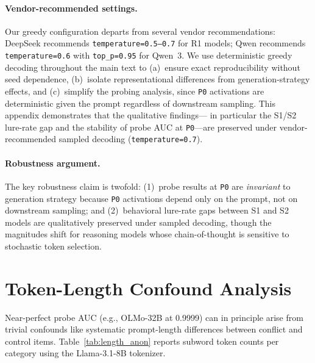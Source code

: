 \documentclass{article}
\newcommand{\pzero}{\texttt{P0}}
\begin{document}
\paragraph{Vendor-recommended settings.}
Our greedy configuration departs from several vendor recommendations:
DeepSeek recommends \texttt{temperature=0.5--0.7} for R1 models;
Qwen recommends \texttt{temperature=0.6} with \texttt{top\_p=0.95}
for Qwen~3.  We use deterministic greedy decoding throughout the main
text to (a)~ensure exact reproducibility without seed dependence,
(b)~isolate representational differences from generation-strategy
effects, and (c)~simplify the probing analysis, since \pzero{}
activations are deterministic given the prompt regardless of downstream
sampling.  This appendix demonstrates that the qualitative findings---
in particular the S1/S2 lure-rate gap and the stability of probe AUC
at \pzero{}---are preserved under vendor-recommended sampled decoding
(\texttt{temperature=0.7}).

\paragraph{Robustness argument.}
The key robustness claim is twofold: (1)~probe results at \pzero{}
are \emph{invariant} to generation strategy because \pzero{} activations
depend only on the prompt, not on downstream sampling; and
(2)~behavioral lure-rate gaps between S1 and S2 models are qualitatively
preserved under sampled decoding, though the magnitudes shift for
reasoning models whose chain-of-thought is sensitive to stochastic
token selection.

\section{Token-Length Confound Analysis}
\label{app:length_anon}

Near-perfect probe AUC (e.g., OLMo-32B at 0.9999) can in principle
arise from trivial confounds like systematic prompt-length differences
between conflict and control items.  Table~\ref{tab:length_anon}
reports subword token counts per category using the Llama-3.1-8B
tokenizer.
\end{document}
